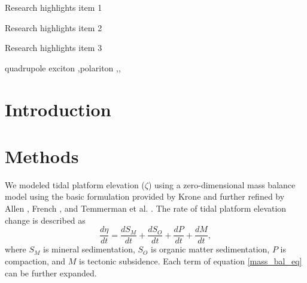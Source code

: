 \documentclass[a4paper,fleqn]{cas-sc}
\begin{document}
\begin{abstract}
This template helps you to create a properly formatted \LaTeX\ manuscript.

\noindent\texttt{\textbackslash begin{abstract}} \dots 
\texttt{\textbackslash end{abstract}} and
\verb+\begin{keyword}+ \verb+...+ \verb+\end{keyword}+ 
which
contain the abstract and keywords respectively. 
Each keyword shall be separated by a \verb+\sep+ command.
\end{abstract}

\begin{highlights}
\item Research highlights item 1
\item Research highlights item 2
\item Research highlights item 3
\end{highlights}

\begin{keywords}
quadrupole exciton \sep polariton \sep \WGM \sep \BEC
\end{keywords}


\maketitle


\section{Introduction}

\section{Methods}

We modeled tidal platform elevation ($\zeta$) using a zero-dimensional mass balance model using the basic formulation provided by Krone \citet{kroneMethodSimulatingMarsh1987} and further refined by Allen \citet{allenSaltmarshGrowthStratification1990}, French \citet{frenchNumericalSimulationVertical1993}, and Temmerman et al. \citet{temmermanModellingLongtermTidal2003,temmermanModellingEstuarineVariations2004}. The rate of tidal platform elevation change is described as
\begin{equation}\label{mass_bal_eq}
	\frac{d \eta}{d t} = \frac{d S_M}{d t} + \frac{d S_O}{d t} + \frac{d P}{d t} + \frac{d M}{d t},
\end{equation}
where $S_M$ is mineral sedimentation, $S_O$ is organic matter sedimentation, $P$ is compaction, and $M$ is tectonic subsidence. Each term of equation \ref{mass_bal_eq} can be further expanded.
\end{document}

